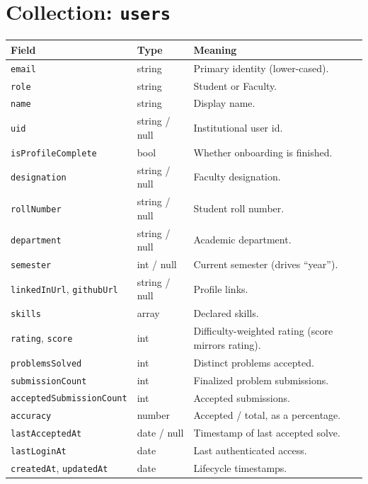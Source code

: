 \documentclass[12pt,a4paper,oneside]{report}
\newcommand{\code}[1]{\texttt{#1}}
\begin{document}
\section{Collection: \code{users}}
\begin{xltabular}{\linewidth}{@{}l l X@{}}
\toprule
\textbf{Field} & \textbf{Type} & \textbf{Meaning}\\
\midrule
\endhead
\code{email} & string & Primary identity (lower-cased).\\
\code{role} & string & Student or Faculty.\\
\code{name} & string & Display name.\\
\code{uid} & string / null & Institutional user id.\\
\code{isProfileComplete} & bool & Whether onboarding is finished.\\
\code{designation} & string / null & Faculty designation.\\
\code{rollNumber} & string / null & Student roll number.\\
\code{department} & string / null & Academic department.\\
\code{semester} & int / null & Current semester (drives ``year'').\\
\code{linkedInUrl}, \code{githubUrl} & string / null & Profile links.\\
\code{skills} & array & Declared skills.\\
\code{rating}, \code{score} & int & Difficulty-weighted rating (score mirrors rating).\\
\code{problemsSolved} & int & Distinct problems accepted.\\
\code{submissionCount} & int & Finalized problem submissions.\\
\code{acceptedSubmissionCount} & int & Accepted submissions.\\
\code{accuracy} & number & Accepted / total, as a percentage.\\
\code{lastAcceptedAt} & date / null & Timestamp of last accepted solve.\\
\code{lastLoginAt} & date & Last authenticated access.\\
\code{createdAt}, \code{updatedAt} & date & Lifecycle timestamps.\\
\bottomrule
\end{xltabular}
\end{document}
